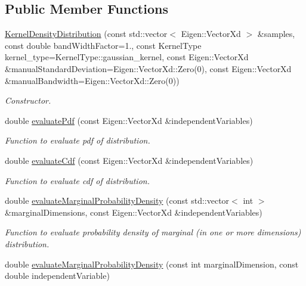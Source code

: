 \subsection*{Public Member Functions}
\begin{DoxyCompactItemize}
\item 
\hyperlink{classtudat_1_1statistics_1_1KernelDensityDistribution_ae326df1759095eb05aae78280bf7fa20}{Kernel\+Density\+Distribution} (const std\+::vector$<$ Eigen\+::\+Vector\+Xd $>$ \&samples, const double band\+Width\+Factor=1., const Kernel\+Type kernel\+\_\+type=Kernel\+Type\+::gaussian\+\_\+kernel, const Eigen\+::\+Vector\+Xd \&manual\+Standard\+Deviation=Eigen\+::\+Vector\+Xd\+::\+Zero(0), const Eigen\+::\+Vector\+Xd \&manual\+Bandwidth=Eigen\+::\+Vector\+Xd\+::\+Zero(0))
\begin{DoxyCompactList}\small\item\em Constructor. \end{DoxyCompactList}\item 
double \hyperlink{classtudat_1_1statistics_1_1KernelDensityDistribution_ac8713330d605559df79f572175d9136c}{evaluate\+Pdf} (const Eigen\+::\+Vector\+Xd \&independent\+Variables)
\begin{DoxyCompactList}\small\item\em Function to evaluate pdf of distribution. \end{DoxyCompactList}\item 
double \hyperlink{classtudat_1_1statistics_1_1KernelDensityDistribution_a414da60bdbf0bbcd97cdccc42521d6aa}{evaluate\+Cdf} (const Eigen\+::\+Vector\+Xd \&independent\+Variables)
\begin{DoxyCompactList}\small\item\em Function to evaluate cdf of distribution. \end{DoxyCompactList}\item 
double \hyperlink{classtudat_1_1statistics_1_1KernelDensityDistribution_a7ae58f7bbdc51bdfbb0655ff98fee4dc}{evaluate\+Marginal\+Probability\+Density} (const std\+::vector$<$ int $>$ \&marginal\+Dimensions, const Eigen\+::\+Vector\+Xd \&independent\+Variables)
\begin{DoxyCompactList}\small\item\em Function to evaluate probability density of marginal (in one or more dimensions) distribution. \end{DoxyCompactList}\item 
double \hyperlink{classtudat_1_1statistics_1_1KernelDensityDistribution_a17e30a2f4db5bfb68c35d3be551802bb}{evaluate\+Marginal\+Probability\+Density} (const int marginal\+Dimension, const double independent\+Variable)

\end{DoxyCompactItemize}
